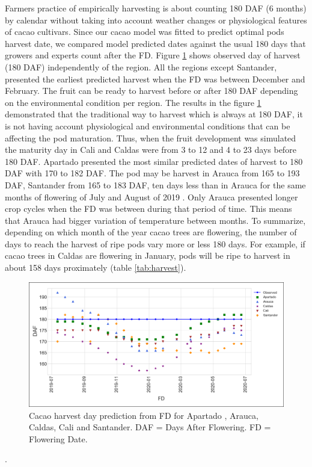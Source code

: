 \documentclass[gene,journal,article,submit,moreauthors,pdftex]{Definitions/mdpi}
\begin{document}
Farmers practice of empirically harvesting is about counting  180 DAF (6 months) by calendar without taking into account weather changes or physiological features of cacao cultivars.
Since our cacao model was fitted to predict optimal pods harvest date, we compared model predicted dates against the usual 180 days that growers and experts count after the FD. Figure \ref{fig:dayH} shows observed day of harvest (180 DAF) independently of the region. All the regions except Santander, presented the earliest predicted harvest when the FD was between December and February. The fruit can be ready to harvest before or after 180 DAF depending on the environmental condition per region. The results in the figure \ref{fig:dayH} demonstrated that the traditional way to harvest which is always at 180 DAF, it is not having account physiological and environmental conditions that can be affecting the pod maturation. Thus, when the fruit development was simulated the maturity day in Cali and Caldas were from 3 to 12 and 4 to 23 days before 180 DAF. Apartado presented the most similar predicted dates of harvest to 180 DAF with 170 to 182 DAF. The pod may be harvest in Arauca from 165 to 193 DAF, Santander from 165 to 183 DAF, ten days less than in Arauca for the same months of flowering of July and August of 2019 . Only Arauca presented longer crop cycles when the FD was between during that period of time. This means that Arauca had bigger variation of temperature between months. To summarize, depending on which month of the year cacao trees are flowering,  the number of days to reach the harvest of ripe pods vary more or less 180 days. For example, if cacao trees in Caldas are flowering in January, pods will be ripe to harvest in about 158 days proximately  (table \ref{tab:harvest}). 
 
\begin{figure}[h!]
	\centering
	\includegraphics[scale=0.4]{images/RegionHarvest2.png}
	\caption{\footnotesize {Cacao harvest day prediction from FD for Apartado , Arauca, Caldas, Cali  and  Santander. DAF = Days After Flowering. FD = Flowering Date. \\ }} 
	\label{fig:dayH}
\end{figure}.
\newpage
\end{document}
